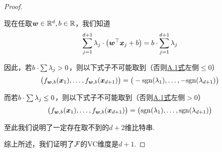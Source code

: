 \begin{proof}
\begin{enumerate}
    现在任取$\boldsymbol{w}\in \mathbb{R}^d, b\in \mathbb{R}$，我们知道 
    \begin{equation} \label{eq:hw2-1}
    \sum_{j=1}^{d+1} \lambda_j \cdot \big(\boldsymbol{w}^{\top}\boldsymbol{x}_j + b\big) = b \cdot \sum_{j=1}^{d+1} \lambda_j
    \end{equation}

    因此，若$b\cdot\sum \lambda_j > 0$，则以下式子不可能取到（否则\hyperref[eq:hw2-1]{A.1式}左侧$\le 0$）
    \[
    \big(f_{\boldsymbol{w},b}(\boldsymbol{x}_1), \dots, f_{\boldsymbol{w},b}(\boldsymbol{x}_{d+1})\big) = \big(-\mathrm{sgn}(\lambda_1), \dots, -\mathrm{sgn}(\lambda_{d+1})\big)
    \]

    而若$b\cdot\sum \lambda_j \le 0$，则以下式子不可能取到（否则\hyperref[eq:hw2-1]{A.1式}左侧$>0$）
    \[
    \big(f_{\boldsymbol{w},b}(\boldsymbol{x}_1), \dots, f_{\boldsymbol{w},b}(\boldsymbol{x}_{d+1})\big) = \big(\mathrm{sgn}(\lambda_1), \dots, \mathrm{sgn}(\lambda_{d+1})\big)
    \] 
    
    至此我们说明了一定存在取不到的$d+2$维比特串.
    
\end{enumerate}
综上所述，我们证明了$\mathcal{F}$的VC维度是$d+1$.
\end{proof}